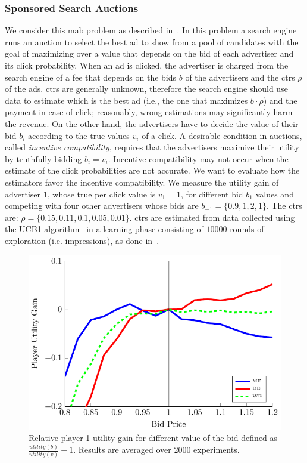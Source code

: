 \subsubsection{Sponsored Search Auctions}
We consider this \gls{mab} problem as described in~\cite{xu2013mab}. In this problem a search engine runs an auction to select the best ad to show from a pool of candidates with the goal of maximizing over a value that depends on the bid of each advertiser and its click probability. 
When an ad is clicked, the advertiser is charged from the search engine of a fee that depends on the bids $b$ of the advertisers and the \glspl{ctr} $\rho$ of the ads. 
\glspl{ctr} are generally unknown, therefore the search engine should use data to estimate which is the best ad (i.e., the one that maximizes $b\cdot\rho$) and the payment in case of click; reasonably, wrong estimations may significantly harm the revenue.
On the other hand, the advertisers have to decide the value of their bid $b_i$ according to the true values $v_i$ of a click. A desirable condition in auctions, called \textit{incentive compatibility}, requires that the advertisers maximize their utility by truthfully bidding $b_i = v_i$. Incentive compatibility may not occur when the estimate of the click probabilities are not accurate. We want to evaluate how the estimators favor the incentive compatibility.
We measure the utility gain of advertiser $1$, whose true per click value is $v_1 = 1$, for different bid $b_1$ values and competing with four other advertisers whose bids are $b_{-1} = \lbrace 0.9, 1, 2, 1 \rbrace$. The \glspl{ctr} are: $\rho = \lbrace 0.15, 0.11, 0.1, 0.05, 0.01 \rbrace$. 
\glspl{ctr} are estimated from data collected using the UCB1 algorithm~\cite{auer2002finite} in a learning phase consisting of $10000$ rounds of exploration (i.e. impressions), as done in~\cite{xu2013mab}.

\begin{figure}[t]
    \begin{minipage}{\columnwidth}
    \centering 
    \includegraphics[scale=0.9]{./img/sponsoredSearch.pdf}
    \caption[Sponsored Search Auctions results]{Relative player 1 utility gain for different value of the bid defined as $\frac{utility(b)}{utility(v)} - 1$. Results are averaged over 2000 experiments.}\label{F:spSearch}
    \end{minipage}
\end{figure}

